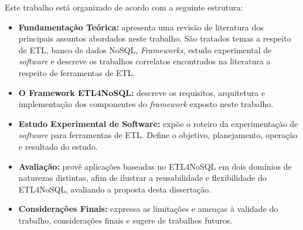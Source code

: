 Este trabalho está organizado de acordo com a seguinte estrutura:

\begin{itemize}
	\item \textbf{Fundamentação Teórica:} apresenta uma revisão de literatura dos principais assuntos abordados neste trabalho. São tratados temas a respeito de ETL, banco de dados NoSQL, \textit{Frameworks}, estudo experimental de \textit{software} e descreve os trabalhos correlatos encontrados na literatura a respeito de ferramentas de ETL.
	
	\item \textbf{O Framework ETL4NoSQL:} descreve os requisitos, arquitetura e implementação dos componentes do \textit{framework} exposto neste trabalho.
			
	\item \textbf{Estudo Experimental de Software:} expõe o roteiro da experimentação de \textit{software} para ferramentas de ETL. Define o objetivo, planejamento, operação e resultado do estudo.
	
	\item \textbf{Avaliação:} provê aplicações baseadas no ETL4NoSQL em dois domínios de naturezas distintas, afim de ilustrar a reusabilidade e flexibilidade do ETL4NoSQL, avaliando a proposta desta dissertação.
		
	\item \textbf{Considerações Finais:} expressa as limitações e ameaças à validade do trabalho, considerações finais e sugere de trabalhos futuros.	
	
\end{itemize}

